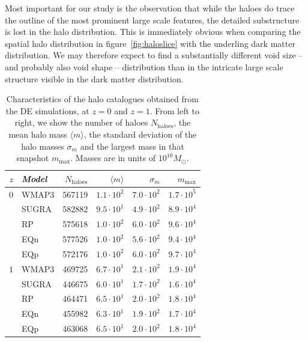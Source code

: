 Most important for our study is the observation that while the haloes do trace the outline of the most 
prominent large scale features, the detailed substructure is lost in the halo distribution. This is immediately 
obvious when comparing the spatial halo distribution in figure~\ref{fig:haloslice} with the underling 
dark matter distribution. We may therefore expect to find a substantially different void size -- and probably also 
void shape -- distribution than in the intricate large scale structure visible in the dark matter distribution. 

\begin{table}
\begin{small}
\begin{tabular*}{\textwidth}{@{\extracolsep{\fill}}rlrrrr}
\itshape $z$ & \itshape Model & \itshape $N_\mathrm{haloes}$& \itshape $\langle m \rangle$& \itshape $\sigma_m$& \itshape $m_\mathrm{max}$ \\ \hline
$0$  & WMAP3         & 567119        & $1.1\cdot10^2$     & $7.0\cdot10^2$     & $1.7\cdot10^5$ \\
  & SUGRA         & 582882        & $9.5\cdot10^1$     & $4.9\cdot10^2$     & $8.9\cdot10^4$ \\
  & RP    & 575618        & $1.0\cdot10^2$     & $6.0\cdot10^2$     & $9.6\cdot10^4$ \\
  & EQn   & 577526        & $1.0\cdot10^2$     & $5.6\cdot10^2$     & $9.4\cdot10^4$ \\
  & EQp   & 572176        & $1.0\cdot10^2$     & $6.0\cdot10^2$     & $9.7\cdot10^4$ \\ \hline
$1$  & WMAP3         & 469725        & $6.7\cdot10^1$     & $2.1\cdot10^2$     & $1.9\cdot10^4$ \\
  & SUGRA         & 446675        & $6.0\cdot10^1$     & $1.7\cdot10^2$     & $1.6\cdot10^4$ \\
  & RP    & 464471        & $6.5\cdot10^1$     & $2.0\cdot10^2$     & $1.8\cdot10^4$ \\
  & EQn   & 455982        & $6.3\cdot10^1$     & $1.9\cdot10^2$     & $1.7\cdot10^4$ \\
  & EQp   & 463068        & $6.5\cdot10^1$     & $2.0\cdot10^2$     & $1.8\cdot10^4$ \\ \hline
\end{tabular*}
\end{small}
\caption{Characteristics of the halo catalogues obtained from the DE simulations, at $z=0$ and $z=1$. From left to right, we show the number of haloes $N_\mathrm{haloes}$, the mean halo mass $\langle m \rangle$, the standard deviation of the halo masses $\sigma_m$ and the largest mass in that snapshot $m_\mathrm{max}$. Masses are in units of $10^{10} M_\odot$.}
\label{tab:haloes}
\end{table}

